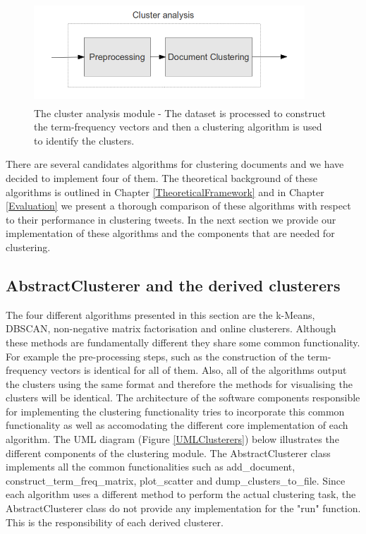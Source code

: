 \begin{figure}[htbp]
  \begin{center}
    \includegraphics[height=1.5in, width=4in]{clustering-overview}
    \caption{The cluster analysis module - The dataset is processed to construct the term-frequency vectors and then a clustering algorithm is used to identify the clusters.}
    \label{ClusteringOverview}
  \end{center}
\end{figure} 

There are several candidates algorithms for clustering documents and we have decided to implement four of them. The theoretical background of these algorithms is outlined in Chapter \ref{TheoreticalFramework} and in Chapter \ref{Evaluation} we present a thorough comparison of these algorithms with respect to their performance in clustering tweets.  
In the next section we provide our implementation of these algorithms and the components that are needed for clustering. 

\subsection{AbstractClusterer and the derived clusterers}
The four different algorithms presented in this section are the k-Means, DBSCAN, non-negative matrix factorisation and online clusterers. Although these methods are fundamentally different they share some common functionality. For example the pre-processing steps, such as the construction of the term-frequency vectors is identical for all of them. Also, all of the algorithms output the clusters using the same format and therefore the methods for visualising the clusters will be identical. The architecture of the software components responsible for implementing the clustering functionality tries to incorporate this common functionality as well as accomodating the different core implementation of each algorithm. The UML diagram (Figure \ref{UMLClusterers}) below illustrates the different components of the clustering module. The AbstractClusterer class implements all the common functionalities such as add\_document, construct\_term\_freq\_matrix, plot\_scatter and dump\_clusters\_to\_file. Since each algorithm uses a different method to perform the actual clustering task, the AbstractClusterer class do not provide any implementation for the "run" function. This is the responsibility of each derived clusterer. 

